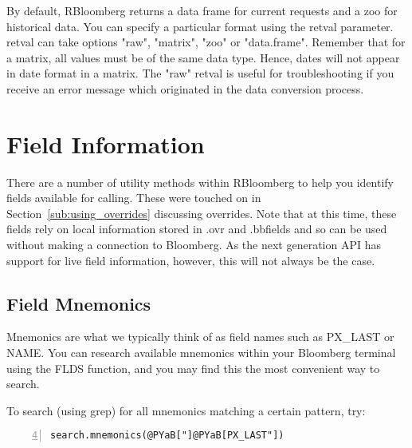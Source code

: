 \documentclass[a4paper]{article}
\begin{document}
By default, RBloomberg returns a data frame for current requests and a zoo for historical data. You can specify a particular format using the retval parameter. retval can take options "raw", "matrix", "zoo" or "data.frame". Remember that for a matrix, all values must be of the same data type. Hence, dates will not appear in date format in a matrix. The "raw" retval is useful for troubleshooting if you receive an error message which originated in the data conversion process.



\section{Field Information} %
\label{sec:field_information}

There are a number of utility methods within RBloomberg to help you identify fields available for calling. These were touched on in Section~\ref{sub:using_overrides} discussing overrides. Note that at this time, these fields rely on local information stored in .ovr and .bbfields and so can be used without making a connection to Bloomberg. As the next generation API has support for live field information, however, this will not always be the case.

\subsection{Field Mnemonics} %
\label{sub:field_mnemonics}

Mnemonics are what we typically think of as field names such as PX\_LAST or NAME. You can research available mnemonics within your Bloomberg terminal using the FLDS function, and you may find this the most convenient way to search.

To search (using grep) for all mnemonics matching a certain pattern, try:

\begin{Verbatim}[commandchars=@\[\],numbers=left,firstnumber=4,stepnumber=1]
search.mnemonics(@PYaB["]@PYaB[PX_LAST"])
\end{Verbatim}

    
\end{document}
